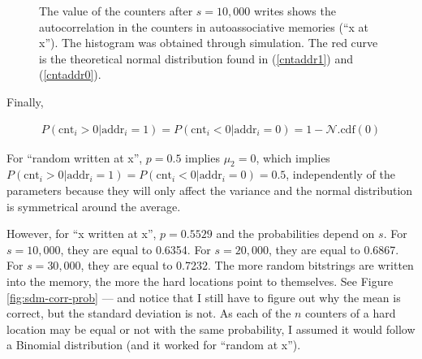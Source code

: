 \documentclass[12pt]{article}
\begin{document}
\begin{figure}[h!]
  \centering

  \caption{The value of the counters after $s=10,000$ writes shows the autocorrelation in the counters in autoassociative memories (``x at x''). The histogram was obtained through simulation. The red curve is the theoretical normal distribution found in (\ref{cntaddr1}) and (\ref{cntaddr0}).}
  \label{fig:sdm-corr-counters}
\end{figure}


Finally,

\begin{align}
P(\text{cnt}_i > 0 | \text{addr}_i = 1) = P(\text{cnt}_i < 0 | \text{addr}_i = 0) = 1 - \mathcal{N}.\text{cdf}(0)
\end{align}

For ``random written at x'', $p=0.5$ implies $\mu_2 = 0$, which implies $P(\text{cnt}_i > 0 | \text{addr}_i = 1) = P(\text{cnt}_i < 0 | \text{addr}_i = 0) = 0.5$, independently of the parameters because they will only affect the variance and the normal distribution is symmetrical around the average.

However, for ``x written at x'', $p=0.5529$ and the probabilities depend on $s$. For $s=10,000$, they are equal to 0.6354. For $s=20,000$, they are equal to 0.6867. For $s=30,000$, they are equal to 0.7232. The more random bitstrings are written into the memory, the more the hard locations point to themselves. See Figure \ref{fig:sdm-corr-prob} --- and notice that I still have to figure out why the mean is correct, but the standard deviation is not. As each of the $n$ counters of a hard location may be equal or not with the same probability, I assumed it would follow a Binomial distribution (and it worked for ``random at x'').
\end{document}
